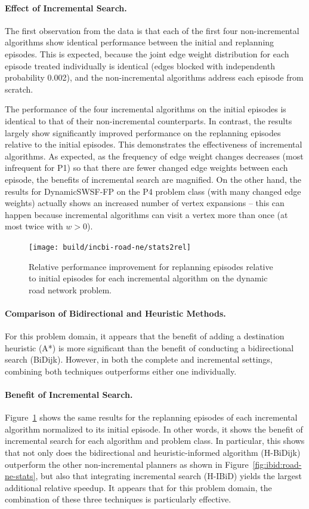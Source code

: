 \paragraph{Effect of Incremental Search.}
The first observation from the data is that
each of the first four non-incremental algorithms
show identical performance between the initial and replanning
episodes.
This is expected,
because the joint edge weight distribution for each episode treated
individually is identical
(edges blocked with independenth probability 0.002),
and the non-incremental algorithms address each episode from scratch.

The performance of the four incremental algorithms on the initial
episodes is identical to that of their non-incremental counterparts.
In contrast, the results largely show
significantly improved performance on the replanning episodes
relative to the initial episodes.
This demonstrates the effectiveness of incremental algorithms.
As expected,
as the frequency of edge weight changes decreases
(most infrequent for P1)
so that there are fewer changed edge weights between each episode,
the benefits of incremental search are magnified.
On the other hand,
the results for DynamicSWSF-FP on the P4 problem class
(with many changed edge weights)
actually shows an increased number of vertex expansions --
this can happen because incremental algorithms can visit a vertex
more than once (at most twice with $w>0$).

\begin{figure}
   \centering
   \texttt{[image: build/incbi-road-ne/stats2rel]}
   \caption{Relative performance improvement for replanning episodes
      relative to initial episodes for each incremental algorithm
      on the dynamic road network problem.}
   \label{fig:ibid:road-ne-stats-rel}
\end{figure}

\paragraph{Comparison of Bidirectional and Heuristic Methods.}
For this problem domain,
it appears that the benefit of adding a destination heuristic (A*)
is more significant than the benefit of conducting a bidirectional
search (BiDijk).
However, in both the complete and incremental settings,
combining both techniques outperforms either one individually.

\paragraph{Benefit of Incremental Search.}
Figure~\ref{fig:ibid:road-ne-stats-rel} shows the same results
for the replanning episodes of each incremental algorithm
normalized to its initial episode.
In other words,
it shows the benefit of incremental search for each algorithm
and problem class.
In particular,
this shows that not only does the bidirectional and heuristic-informed
algorithm (H-BiDijk) outperform the other non-incremental planners
as shown in Figure~\ref{fig:ibid:road-ne-stats},
but also that integrating incremental search (H-IBiD)
yields the largest additional relative speedup.
It appears that for this problem domain,
the combination of these three techniques is particularly effective.

